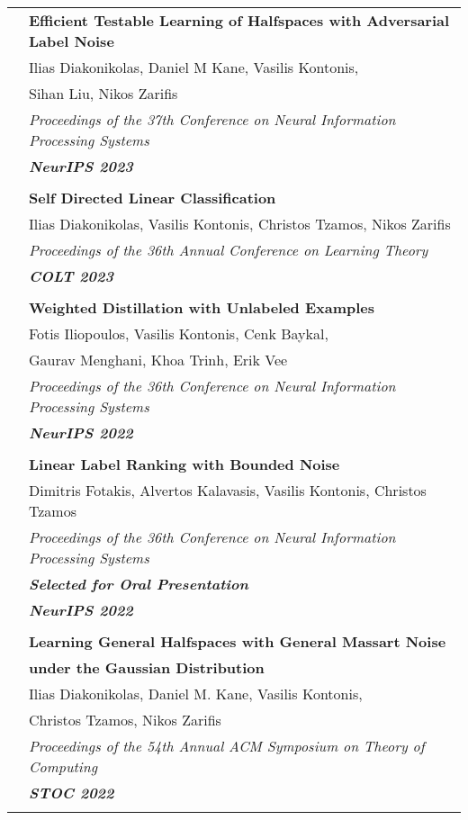 \documentclass[letterpaper,11pt,oneside]{article}
\begin{document}
\begin{longtable}{@{} l l}
 &\textbf{Efficient Testable Learning of Halfspaces with Adversarial Label Noise}\\
 & Ilias Diakonikolas, Daniel M Kane, Vasilis Kontonis, \\
 & Sihan Liu, Nikos Zarifis\\
 & \emph{Proceedings of the 37th Conference on Neural Information Processing Systems} \\
 & \emph{\textbf{NeurIPS 2023}} \\
 & \\


 &\textbf{Self Directed Linear Classification}\\
 & Ilias Diakonikolas, Vasilis Kontonis, Christos Tzamos, Nikos Zarifis \\
 & \emph{Proceedings of the 36th Annual Conference on Learning Theory}\\
 & \emph{\textbf{COLT 2023}} \\
 & \\

 &\textbf{Weighted Distillation with Unlabeled Examples}\\
 & Fotis Iliopoulos, Vasilis Kontonis, Cenk Baykal,\\
 & Gaurav Menghani, Khoa Trinh, Erik Vee\\ 
& \emph{Proceedings of the 36th Conference on Neural Information Processing Systems} \\
& \emph{\textbf{NeurIPS 2022}} \\
 & \\

 &\textbf{Linear Label Ranking with Bounded Noise}\\
 &  Dimitris Fotakis, Alvertos Kalavasis, Vasilis Kontonis, Christos Tzamos \\
& \emph{Proceedings of the 36th Conference on Neural Information Processing Systems} \\
& \emph{\textbf{Selected for Oral Presentation}} \\
& \emph{\textbf{NeurIPS 2022}} \\
 & \\

 &\textbf{Learning General Halfspaces with General Massart Noise}\\
 & \textbf{under the Gaussian Distribution}\\
 & Ilias Diakonikolas, Daniel M. Kane, Vasilis Kontonis,\\
 & Christos Tzamos, Nikos Zarifis \\
 & \emph{Proceedings of the 54th Annual ACM Symposium on Theory of Computing}\\
 & \emph{\textbf{STOC 2022}} \\
 & \\



\end{longtable}
\end{document}

